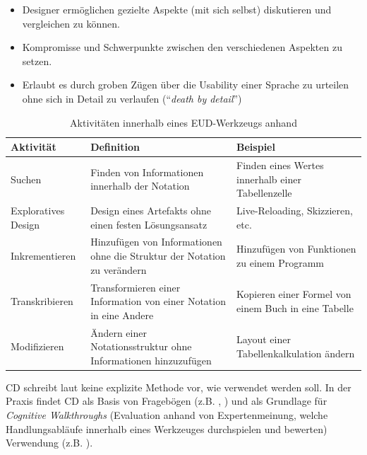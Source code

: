 \begin{itemize}
    \item Designer ermöglichen gezielte Aspekte (mit sich selbst) diskutieren und vergleichen zu können.
    \item Kompromisse und Schwerpunkte zwischen den verschiedenen Aspekten zu setzen.
    \item Erlaubt es durch groben Zügen über die Usability einer Sprache zu urteilen ohne sich in Detail zu verlaufen ("`\textit{death by detail}"')
\end{itemize}

\begin{table}[H]
\centering
\begin{tabularx}{\textwidth}{lXX}
\hline
\rowcolor[HTML]{EFEFEF} 
Aktivität           & Definition                                                               & Beispiel\\ \hline
Suchen              & Finden von Informationen innerhalb der Notation                          & Finden eines Wertes innerhalb einer Tabellenzelle\\ \hline
Exploratives Design & Design eines Artefakts ohne einen festen Lösungsansatz                   & Live-Reloading, Skizzieren, etc.\\ \hline
Inkrementieren      & Hinzufügen von Informationen ohne die Struktur der Notation zu verändern & Hinzufügen von Funktionen zu einem Programm\\ \hline
Transkribieren      & Transformieren einer Information von einer Notation in eine Andere       & Kopieren einer Formel von einem Buch in eine Tabelle\\ \hline
Modifizieren        & Ändern einer Notationsstruktur ohne Informationen hinzuzufügen           & Layout einer Tabellenkalkulation ändern \\ \hline
\end{tabularx}
\caption{Aktivitäten innerhalb eines \ac{EUD}-Werkzeugs anhand \cite{green2000instructions}}
\label{tab:cogaktivitaeten}
\end{table}

\ac{CD} schreibt laut \cite{blackwell2003notational} keine explizite Methode vor, wie verwendet werden soll. In der Praxis findet \ac{CD} als Basis von Fragebögen (z.B. \cite{EBobkowska.2003}, \cite{Wijayarathna.}) und als Grundlage für \textit{Cognitive Walkthroughs} (Evaluation anhand von Expertenmeinung, welche Handlungsabläufe innerhalb eines Werkzeuges durchspielen und bewerten) Verwendung (z.B. \cite{blackwell2000cognitive}). 

